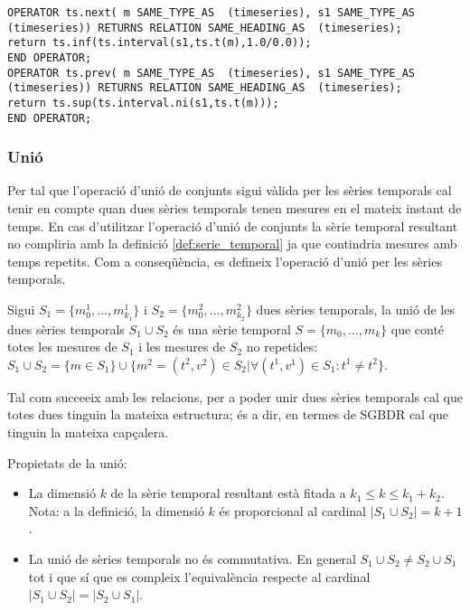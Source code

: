 \begin{verbatim}
OPERATOR ts.next( m SAME_TYPE_AS  (timeseries), s1 SAME_TYPE_AS  (timeseries)) RETURNS RELATION SAME_HEADING_AS  (timeseries);
return ts.inf(ts.interval(s1,ts.t(m),1.0/0.0));
END OPERATOR;
OPERATOR ts.prev( m SAME_TYPE_AS  (timeseries), s1 SAME_TYPE_AS  (timeseries)) RETURNS RELATION SAME_HEADING_AS  (timeseries);
return ts.sup(ts.interval.ni(s1,ts.t(m)));
END OPERATOR;
\end{verbatim}





\subsubsection{Unió}

Per tal que l'operació d'unió de conjunts sigui vàlida per les sèries
temporals cal tenir en compte quan dues sèries temporals tenen mesures
en el mateix instant de temps. En cas d'utilitzar l'operació d'unió de
conjunts la sèrie temporal resultant no compliria amb la definició
\ref{def:serie_temporal} ja que contindria mesures amb temps
repetits. Com a conseqüència, es defineix l'operació d'unió per les
sèries temporals.

\begin{definition}[unió]
  Sigui $S_1=\{m_0^1, \dotsc, m_{k_1}^1\}$ i $S_2=\{m_0^2, \dotsc,
  m_{k_2}^2\}$ dues sèries temporals, la unió de les dues sèries
  temporals $S_1 \cup S_2$ és una sèrie temporal $S=\{m_0, \dotsc,
  m_k\}$ que conté totes les mesures de $S_1$ i les mesures de $S_2$
  no repetides: $S_1 \cup S_2 = \{ m \in S_1 \} \cup \{ m^2 =
  (t^2,v^2) \in S_2 | \forall (t^1,v^1)\in S_1 : t^1 \neq t^2
  \}$. 

  Tal com succeeix amb les relacions, per a poder unir dues sèries
  temporals cal que totes dues tinguin la mateixa estructura; és a dir,
  en termes de SGBDR cal que tinguin la mateixa capçalera.
\end{definition}

Propietats de la unió:

\begin{itemize}
\item La dimensió $k$ de la sèrie temporal resultant està fitada a
  $k_1 \leq k \leq k_1 + k_2$. Nota: a la definició, la dimensió $k$ és
  proporcional al cardinal $|S_1\cup S_2| = k+1$.
\item La unió de sèries temporals no és commutativa. En general
  $S_1\cup S_2 \neq S_2\cup S_1$ tot i que sí que es compleix
  l'equivalència respecte al cardinal $|S_1\cup S_2| = |S_2\cup S_1|$.
\end{itemize}



